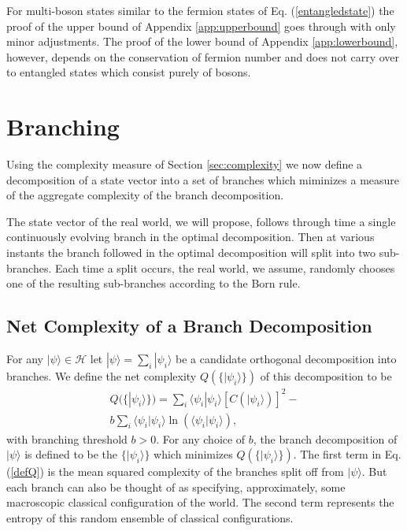 \documentclass[twocolumn,amsmath,amssymb]{revtex4-1}
\begin{document}
For multi-boson states similar to
the fermion states of Eq. (\ref{entangledstate}) the
proof of the upper bound of
Appendix \ref{app:upperbound} goes through with only minor
adjustments. The proof of the
lower bound of Appendix \ref{app:lowerbound}, however,
depends on the conservation of fermion number and does not
carry over to entangled states which
consist purely of bosons.



\section{\label{sec:branching}Branching}

Using the complexity measure of Section \ref{sec:complexity} we now define a
decomposition of a state vector into a set of branches
which miminizes a measure of the aggregate complexity of
the branch decomposition.

The state vector of the real world, we will propose, follows through time
a single continuously evolving branch in the optimal decomposition.
Then at various instants the branch followed in the optimal decomposition
will split into two sub-branches. Each time a split occurs, the real world,
we assume,
randomly chooses one of the resulting sub-branches according to
the Born rule.

\subsection{\label{subsec:branchcomplexity} Net Complexity of a Branch Decomposition}


For any $|\psi \rangle  \in \mathcal{H}$ let 
 $ |\psi \rangle  = \sum_i |\psi_i \rangle $
be a candidate orthogonal decomposition into branches.
We define the net complexity $Q( \{|\psi_i \rangle \})$ of this decomposition to be
\begin{multline}\label{defQ} 
Q( \{|\psi_i \rangle \})  =  \sum_i \langle \psi_i | \psi_i \rangle  [C( |\psi_i \rangle )]^2 - \\
 b \sum_i \langle \psi_i | \psi_i \rangle  \ln( \langle \psi_i |\psi_i \rangle ),
\end{multline} 
with branching threshold $b > 0$. For any choice of $b$, the branch
decomposition of $|\psi \rangle $ is defined to be the $\{|\psi_i \rangle  \}$ which minimizes
$Q(\{|\psi_i \rangle  \})$. The first term in Eq. (\ref{defQ}) is the mean squared complexity
of the branches split off from $|\psi \rangle $. But each branch can also be thought
of as specifying, approximately, some macroscopic classical configuration of the
world. The second term represents the entropy of this random ensemble
of classical configurations.
\end{document}
